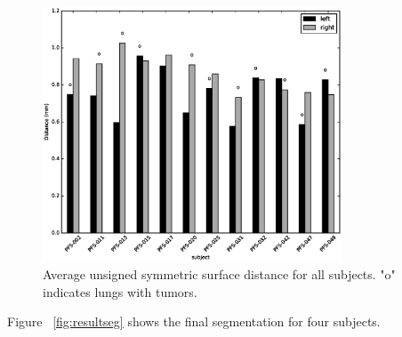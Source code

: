 \documentclass{llncs}
\begin{document}
\begin{figure}[t]
  \centering
    \includegraphics[width=3.5in]{figs/distUnsignSym}
  \caption{Average unsigned symmetric surface distance for all subjects. "o" indicates lungs with tumors.}
  \label{fig:dist}
\end{figure}

Figure ~\ref{fig:resultseg} shows the final segmentation for four subjects. 
\end{document}
